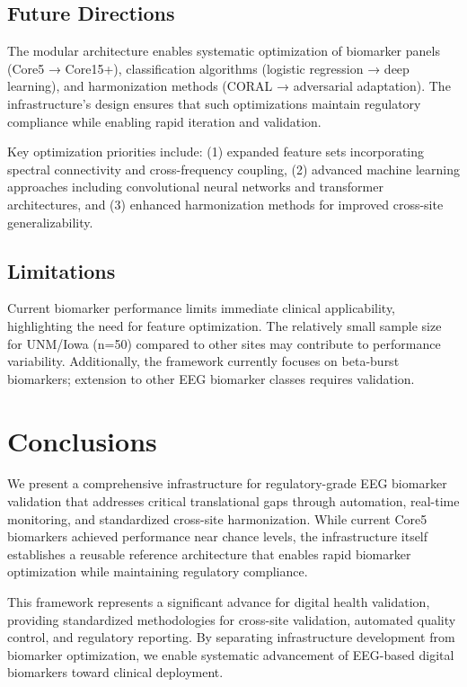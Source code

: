 \documentclass[11pt]{article}
\begin{document}
\subsection{Future Directions}

The modular architecture enables systematic optimization of biomarker panels (Core5 → Core15+), classification algorithms (logistic regression → deep learning), and harmonization methods (CORAL → adversarial adaptation). The infrastructure's design ensures that such optimizations maintain regulatory compliance while enabling rapid iteration and validation.

Key optimization priorities include: (1) expanded feature sets incorporating spectral connectivity and cross-frequency coupling, (2) advanced machine learning approaches including convolutional neural networks and transformer architectures, and (3) enhanced harmonization methods for improved cross-site generalizability.

\subsection{Limitations}

Current biomarker performance limits immediate clinical applicability, highlighting the need for feature optimization. The relatively small sample size for UNM/Iowa (n=50) compared to other sites may contribute to performance variability. Additionally, the framework currently focuses on beta-burst biomarkers; extension to other EEG biomarker classes requires validation.

\section{Conclusions}

We present a comprehensive infrastructure for regulatory-grade EEG biomarker validation that addresses critical translational gaps through automation, real-time monitoring, and standardized cross-site harmonization. While current Core5 biomarkers achieved performance near chance levels, the infrastructure itself establishes a reusable reference architecture that enables rapid biomarker optimization while maintaining regulatory compliance.

This framework represents a significant advance for digital health validation, providing standardized methodologies for cross-site validation, automated quality control, and regulatory reporting. By separating infrastructure development from biomarker optimization, we enable systematic advancement of EEG-based digital biomarkers toward clinical deployment.
\end{document}
